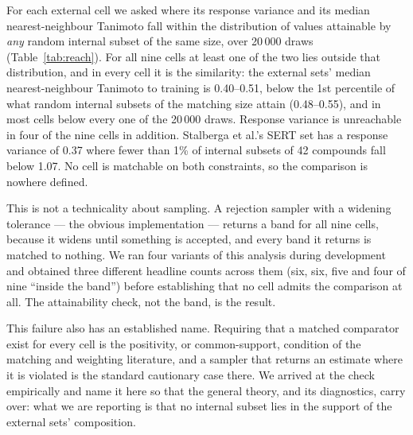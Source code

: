 \documentclass[11pt,a4paper]{article}
\begin{document}
For each external cell we asked where its response variance and its median
nearest-neighbour Tanimoto fall within the distribution of values attainable by
\emph{any} random internal subset of the same size, over 20\,000 draws
(Table~\ref{tab:reach}). For all nine cells at least one of the two lies outside that
distribution, and in every cell it is the similarity: the external sets' median
nearest-neighbour Tanimoto to training is 0.40--0.51, below the 1st percentile of what
random internal subsets of the matching size attain (0.48--0.55), and in most cells below
every one of the 20\,000 draws. Response variance is unreachable in four of the nine
cells in addition. Stalberga et al.'s SERT set has a response variance of 0.37 where
fewer than
1\% of internal subsets of 42 compounds fall below 1.07. No cell is matchable on both
constraints, so the comparison is nowhere defined.

This is not a technicality about sampling. A rejection sampler with a widening tolerance
--- the obvious implementation --- returns a band for all nine cells, because it widens
until something is accepted, and every band it returns is matched to nothing. We ran
four variants of this analysis during development and obtained three different headline
counts across them (six, six, five and four of nine ``inside the band'') before
establishing that no
cell admits the comparison at all. The attainability check, not the band, is the result.

This failure also has an established name. Requiring that a matched comparator exist for
every cell is the positivity, or common-support, condition of the matching and weighting
literature, and a sampler that returns an estimate where it is violated is the standard
cautionary case there.\cite{Westreich2010} We arrived at the check empirically and name it
here so that the general theory, and its diagnostics, carry over: what we are reporting is
that no internal subset lies in the support of the external sets' composition.
\end{document}
